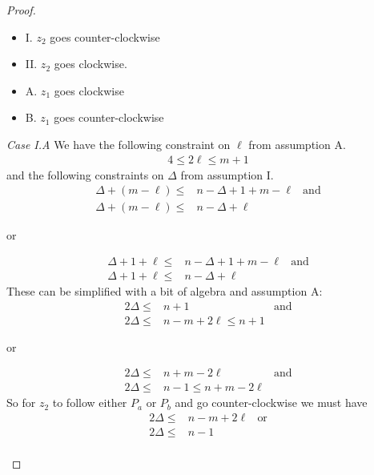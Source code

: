 \begin{proof}
\begin{proofpart}
  \begin{itemize}
   \item I. $z_2$ goes counter-clockwise
   \item II. $z_2$ goes clockwise.
   \item A. $z_1$ goes clockwise
   \item B. $z_1$ goes counter-clockwise
  \end{itemize}

  \textit{Case I.A} We have the following constraint on $\ell$ from
  assumption A.
  \begin{align*}
   4 \leq 2 \ell \leq m + 1
  \end{align*}
  and the following constraints on $\Delta$ from assumption I.
  \begin{align*}
   \Delta + (m - \ell) \leq & n - \Delta + 1 + m - \ell & \text{and} \\
   \Delta + (m - \ell) \leq & n - \Delta + \ell
  \end{align*}
  \begin{center}or\end{center}
  \begin{align*}
   \Delta + 1 + \ell \leq & n - \Delta + 1 + m - \ell & \text{and} \\
   \Delta + 1 + \ell \leq & n - \Delta + \ell
  \end{align*}
  These can be simplified with a bit of algebra and assumption A:
  \begin{align*}
   2 \Delta \leq & n+1                    & \text{and} \\
   2 \Delta \leq & n - m + 2\ell \leq n+1
  \end{align*}
  \begin{center}or\end{center}
  \begin{align*}
   2 \Delta \leq & n+m -2 \ell             & \text{and} \\
   2 \Delta \leq & n -1 \leq n + m - 2\ell
  \end{align*}
  So for $z_2$ to follow either $P_a$ or $P_b$ and go counter-clockwise we must have
  \begin{align*}
   2 \Delta \leq & n - m + 2\ell & \text{or} \\
   2 \Delta \leq & n - 1                     \\
  \end{align*}


\end{proofpart}
\end{proof}
